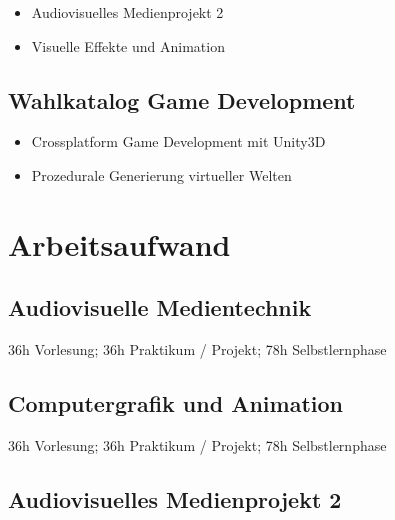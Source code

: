 \begin{itemize}
\tightlist
\item
  Audiovisuelles Medienprojekt 2
\item
  Visuelle Effekte und Animation
\end{itemize}

\subsection*{Wahlkatalog Game
Development\label{/mi-2017/modulbeschreibungen-bachelor/BA_Vertiefung-Visual-Computing}}\label{wahlkatalog-game-developmentpathlabelmi-2017modulbeschreibungen-bachelorbaux5fvertiefung-visual-computing}

\begin{itemize}
\tightlist
\item
  Crossplatform Game Development mit Unity3D
\item
  Prozedurale Generierung virtueller Welten
\end{itemize}

\section*{Arbeitsaufwand\label{/mi-2017/modulbeschreibungen-bachelor/BA_Vertiefung-Visual-Computing}}\label{arbeitsaufwandpathlabelmi-2017modulbeschreibungen-bachelorbaux5fvertiefung-visual-computing}

\subsection*{Audiovisuelle
Medientechnik\label{/mi-2017/modulbeschreibungen-bachelor/BA_Vertiefung-Visual-Computing}}\label{audiovisuelle-medientechnikpathlabelmi-2017modulbeschreibungen-bachelorbaux5fvertiefung-visual-computing}

36h Vorlesung; 36h Praktikum / Projekt; 78h Selbstlernphase

\subsection*{Computergrafik und
Animation\label{/mi-2017/modulbeschreibungen-bachelor/BA_Vertiefung-Visual-Computing}}\label{computergrafik-und-animationpathlabelmi-2017modulbeschreibungen-bachelorbaux5fvertiefung-visual-computing}

36h Vorlesung; 36h Praktikum / Projekt; 78h Selbstlernphase

\subsection*{Audiovisuelles Medienprojekt
2\label{/mi-2017/modulbeschreibungen-bachelor/BA_Vertiefung-Visual-Computing}}\label{audiovisuelles-medienprojekt-2pathlabelmi-2017modulbeschreibungen-bachelorbaux5fvertiefung-visual-computing}

